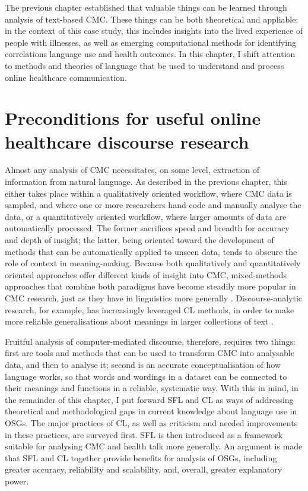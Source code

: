 The previous chapter established that valuable things can be learned through analysis of text\hyp{}based \gls{CMC}. These things can be both theoretical and appliable: in the context of this case study, this includes insights into the lived experience of people with illnesses, as well as emerging computational methods for identifying correlations language use and health outcomes. In this chapter, I shift attention to methods and theories of language that be used to understand and process online healthcare communication.

\section{Preconditions for useful online healthcare discourse research}

Almost any analysis of \gls{CMC} necessitates, on some level, extraction of information from natural language. As described in the previous chapter, this either takes place within a qualitatively oriented workflow, where \gls{CMC} data is sampled, and where one or more researchers hand\hyp{}code and manually analyse the data, or a quantitatively oriented workflow, where larger amounts of data are automatically processed. The former sacrifices speed and breadth for accuracy and depth of insight; the latter, being oriented toward the development of methods that can be automatically applied to unseen data, tends to obscure the role of context in meaning\hyp{}making. Because both qualitatively and quantitatively oriented approaches offer different kinds of insight into \gls{CMC}, mixed\hyp{}methods approaches that combine both paradigms have become steadily more popular in \gls{CMC} research, just as they have in linguistics more generally \cite{bolander2014doing}. Discourse\hyp{}analytic research, for example, has increasingly leveraged \gls{CL} methods, in order to make more reliable generalisations about meanings in larger collections of text \cite{baker2015corpus}.

Fruitful analysis of computer\hyp{}mediated discourse, therefore, requires two things: first are tools and methods that can be used to transform \gls{CMC} into analysable data, and then to analyse it; second is an accurate conceptualisation of how language works, so that words and wordings in a dataset can be connected to their meanings and functions in a reliable, systematic way. With this in mind, in the remainder of this chapter, I put forward \gls{SFL} and \gls{CL} as ways of addressing theoretical and methodological gaps in current knowledge about language use in \glspl{OSG}. The major practices of \gls{CL}, as well as criticism and needed improvements in these practices, are surveyed first. \gls{SFL} is then introduced as a framework suitable for analysing \gls{CMC} and health talk more generally. An argument is made that \gls{SFL} and \gls{CL} together provide benefits for analysis of \glspl{OSG}, including greater accuracy, reliability and scalability, and, overall, greater explanatory power.

